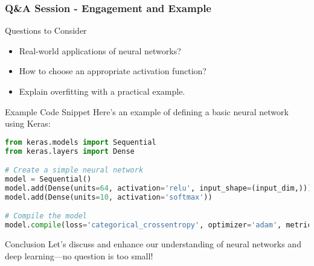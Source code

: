 \documentclass[aspectratio=169]{beamer}
\begin{document}
\begin{frame}[fragile]
  \frametitle{Q\&A Session - Engagement and Example}
  \begin{block}{Questions to Consider}
    \begin{itemize}
      \item Real-world applications of neural networks?
      \item How to choose an appropriate activation function?
      \item Explain overfitting with a practical example.
    \end{itemize}
  \end{block}

  \begin{block}{Example Code Snippet}
    Here’s an example of defining a basic neural network using Keras:
    \begin{lstlisting}[language=Python]
from keras.models import Sequential
from keras.layers import Dense

# Create a simple neural network
model = Sequential()
model.add(Dense(units=64, activation='relu', input_shape=(input_dim,)))
model.add(Dense(units=10, activation='softmax'))

# Compile the model
model.compile(loss='categorical_crossentropy', optimizer='adam', metrics=['accuracy'])
    \end{lstlisting}
  \end{block}
  
  \begin{block}{Conclusion}
    Let’s discuss and enhance our understanding of neural networks and deep learning—no question is too small!
  \end{block}
\end{frame}
\end{document}
